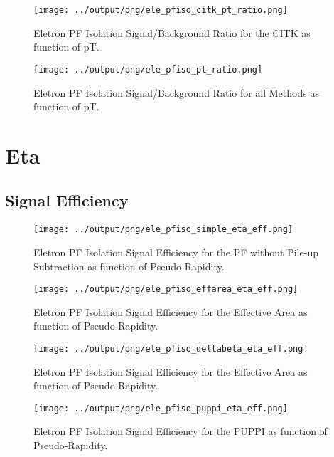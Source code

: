 \documentclass[11pt]{book}
\begin{document}
\begin{figure}[htb]
\centering
\texttt{[image: ../output/png/ele\_pfiso\_citk\_pt\_ratio.png]}
\caption{Eletron PF Isolation Signal/Background Ratio for the CITK as function of pT.}
\label{fig:ele_pfiso_pt_ratio_citk}
\end{figure}


\begin{figure}[htb]
\centering
\texttt{[image: ../output/png/ele\_pfiso\_pt\_ratio.png]}
\caption{Eletron PF Isolation Signal/Background Ratio for all Methods as function of pT.}
\label{fig:ele_pfiso_pt_ratio}
\end{figure}
\clearpage


\section{Eta}

\subsection{Signal Efficiency}
\begin{figure}[htb]
\centering
\texttt{[image: ../output/png/ele\_pfiso\_simple\_eta\_eff.png]}
\caption{Eletron PF Isolation Signal Efficiency for the PF without Pile-up Subtraction as function of Pseudo-Rapidity.}
\label{fig:ele_pfiso_eta_eff_simple}
\end{figure}

\begin{figure}[htb]
\centering
\texttt{[image: ../output/png/ele\_pfiso\_effarea\_eta\_eff.png]}
\caption{Eletron PF Isolation Signal Efficiency for the Effective Area as function of Pseudo-Rapidity.}
\label{fig:ele_pfiso_eta_eff_effarea}
\end{figure}

\begin{figure}[htb]
\centering
\texttt{[image: ../output/png/ele\_pfiso\_deltabeta\_eta\_eff.png]}
\caption{Eletron PF Isolation Signal Efficiency for the Effective Area as function of Pseudo-Rapidity.}
\label{fig:ele_pfiso_eta_eff_deltabeta}
\end{figure}

\begin{figure}[htb]
\centering
\texttt{[image: ../output/png/ele\_pfiso\_puppi\_eta\_eff.png]}
\caption{Eletron PF Isolation Signal Efficiency for the PUPPI as function of Pseudo-Rapidity.}
\label{fig:ele_pfiso_eta_eff_puppi}
\end{figure}
\end{document}
